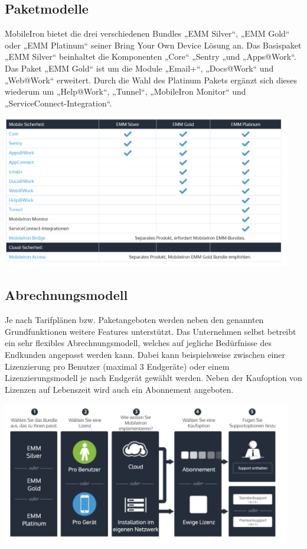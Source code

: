 \subsection {Paketmodelle}
MobileIron bietet die drei verschiedenen Bundles „EMM Silver“, „EMM Gold“ oder „EMM Platinum“ seiner Bring Your Own Device Lösung an.
Das Basispaket „EMM Silver“ beinhaltet die Komponenten „Core“ „Sentry „und „Apps@Work“. Das Paket „EMM Gold“ ist um die Module „Email+“, „Docs@Work“ und „Web@Work“ erweitert. Durch die Wahl des Platinum Pakets ergänzt sich dieses wiederum um „Help@Work“, „Tunnel“, „MobileIron Monitor“ und „ServiceConnect-Integration“.

\includegraphics[width=0.95\textwidth]{Bilder/mi_1.png} 

\subsection {Abrechnungsmodell}

Je nach Tarifplänen bzw. Paketangeboten werden neben den genannten Grundfunktionen weitere Features unterstützt. Das Unternehmen selbst betreibt ein sehr flexibles Abrechnungsmodell, welches auf jegliche Bedürfnisse des Endkunden angepasst werden kann. Dabei kann beispielsweise zwischen einer Lizenzierung pro Benutzer (maximal 3 Endgeräte) oder einem Lizenzierungsmodell je nach Endgerät gewählt werden. Neben der Kaufoption von Lizenzen auf Lebenszeit wird auch ein Abonnement angeboten. 

\includegraphics[width=0.95\textwidth]{Bilder/mi_2.png} 